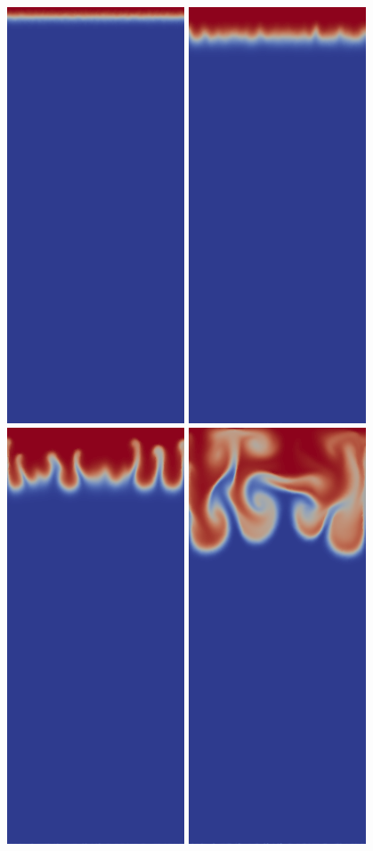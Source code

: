 \begin{figure}[H]
	\centering
	      \includegraphics[width=0.19\columnwidth]{./examples_images/tephra_settling/tephra_fine_1.png}
	      \includegraphics[width=0.19\columnwidth]{./examples_images/tephra_settling/tephra_fine_2.png}
	      \includegraphics[width=0.19\columnwidth]{./examples_images/tephra_settling/tephra_fine_3.png}
	      \includegraphics[width=0.19\columnwidth]{./examples_images/tephra_settling/tephra_fine_4.png}

\end{figure}
